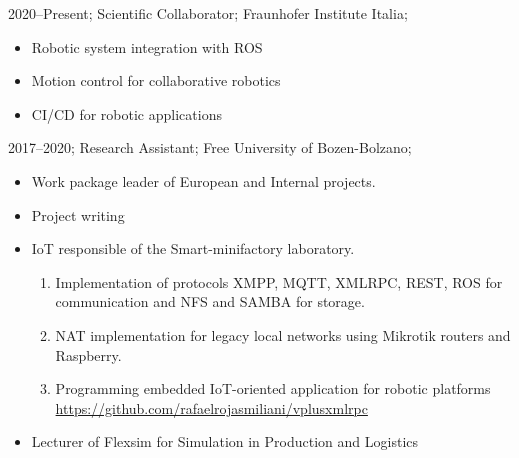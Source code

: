 \addwork%
{%
    2020--Present;%
    Scientific Collaborator;%
    Fraunhofer Institute Italia;%
    \begin{itemize}
        \item Robotic system integration with ROS
        \item Motion control for collaborative robotics
        \item CI/CD for robotic applications
    \end{itemize}
}%
\addwork%
{%
    2017--2020;%
    Research Assistant;%
    Free University of Bozen-Bolzano;%
    \begin{itemize}
        \item Work package leader of European and Internal projects.
        \item Project writing
        \item IoT responsible of the Smart-minifactory laboratory.
            \ifdefined\extended
                \begin{enumerate}
                    \item Implementation of protocols XMPP, MQTT, XMLRPC, REST, ROS for communication and NFS and SAMBA for storage.
                    \item NAT implementation for legacy local networks using Mikrotik routers and Raspberry.
                    \item Programming embedded IoT-oriented application for robotic platforms \href{https://github.com/rafaelrojasmiliani/vplusxmlrpc}{https://github.com/rafaelrojasmiliani/vplusxmlrpc}
                \end{enumerate}
            \fi
        \item Lecturer of Flexsim for Simulation in Production and Logistics             
    \end{itemize}
}%
\addwork%
